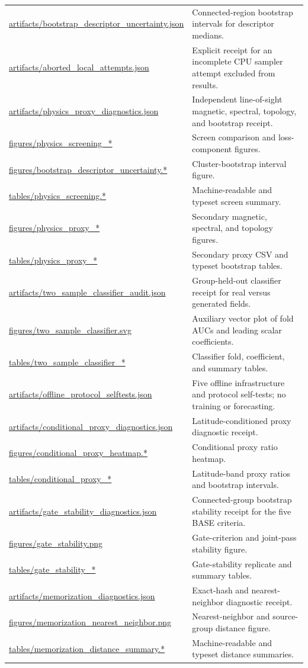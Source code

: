 \documentclass[11pt,oneside]{report}
\begin{document}
\begin{longtable}{p{}p{}}
\url{artifacts/bootstrap_descriptor_uncertainty.json} & Connected-region bootstrap intervals for descriptor medians. \\
\url{artifacts/aborted_local_attempts.json} & Explicit receipt for an incomplete CPU sampler attempt excluded from results. \\
\url{artifacts/physics_proxy_diagnostics.json} & Independent line-of-sight magnetic, spectral, topology, and bootstrap receipt. \\
\url{figures/physics_screening_*} & Screen comparison and loss-component figures. \\
\url{figures/bootstrap_descriptor_uncertainty.*} & Cluster-bootstrap interval figure. \\
\url{tables/physics_screening.*} & Machine-readable and typeset screen summary. \\
\url{figures/physics_proxy_*} & Secondary magnetic, spectral, and topology figures. \\
\url{tables/physics_proxy_*} & Secondary proxy CSV and typeset bootstrap tables. \\
\url{artifacts/two_sample_classifier_audit.json} & Group-held-out classifier receipt for real versus generated fields. \\
\url{figures/two_sample_classifier.svg} & Auxiliary vector plot of fold AUCs and leading scalar coefficients. \\
\url{tables/two_sample_classifier_*} & Classifier fold, coefficient, and summary tables. \\
\url{artifacts/offline_protocol_selftests.json} & Five offline infrastructure and protocol self-tests; no training or forecasting. \\
\url{artifacts/conditional_proxy_diagnostics.json} & Latitude-conditioned proxy diagnostic receipt. \\
\url{figures/conditional_proxy_heatmap.*} & Conditional proxy ratio heatmap. \\
\url{tables/conditional_proxy_*} & Latitude-band proxy ratios and bootstrap intervals. \\
\url{artifacts/gate_stability_diagnostics.json} & Connected-group bootstrap stability receipt for the five BASE criteria. \\
\url{figures/gate_stability.png} & Gate-criterion and joint-pass stability figure. \\
\url{tables/gate_stability_*} & Gate-stability replicate and summary tables. \\
\url{artifacts/memorization_diagnostics.json} & Exact-hash and nearest-neighbor diagnostic receipt. \\
\url{figures/memorization_nearest_neighbor.png} & Nearest-neighbor and source-group distance figure. \\
\url{tables/memorization_distance_summary.*} & Machine-readable and typeset distance summaries. \\
\bottomrule
\end{longtable}
\end{document}
